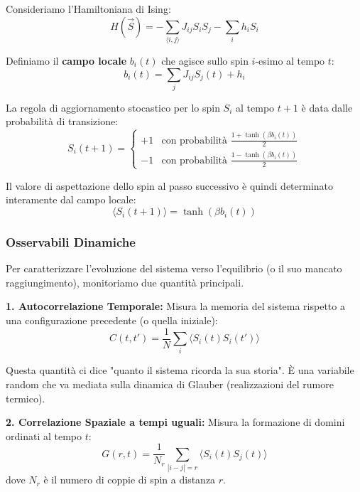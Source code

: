 \noindent Consideriamo l'Hamiltoniana di Ising:
\begin{equation}
H(\vec{S}) = - \sum_{\langle i,j \rangle} J_{ij} S_i S_j - \sum_i h_i S_i
\end{equation}

\noindent Definiamo il \textbf{campo locale} $b_i(t)$ che agisce sullo spin $i$-esimo al tempo $t$:
\begin{equation}
b_i(t) = \sum_{j} J_{ij} S_j(t) + h_i
\end{equation}

\noindent La regola di aggiornamento stocastico per lo spin $S_i$ al tempo $t+1$ è data dalle probabilità di transizione:
\begin{equation}
S_i(t+1) = \begin{cases} 
+1 & \text{con probabilità } \frac{1 + \tanh(\beta b_i(t))}{2} \\
-1 & \text{con probabilità } \frac{1 - \tanh(\beta b_i(t))}{2}
\end{cases}
\end{equation}

\noindent Il valore di aspettazione dello spin al passo successivo è quindi determinato interamente dal campo locale:
\begin{equation}
\langle S_i(t+1) \rangle = \tanh(\beta b_i(t))
\end{equation}

\subsubsection{Osservabili Dinamiche}

Per caratterizzare l'evoluzione del sistema verso l'equilibrio (o il suo mancato raggiungimento), monitoriamo due quantità principali.

\textbf{1. Autocorrelazione Temporale:}
Misura la memoria del sistema rispetto a una configurazione precedente (o quella iniziale):
\begin{equation}
C(t, t') = \frac{1}{N} \sum_i \langle S_i(t) S_i(t') \rangle
\end{equation}

\noindent Questa quantità ci dice "quanto il sistema ricorda la sua storia". È una variabile random che va mediata sulla dinamica di Glauber (realizzazioni del rumore termico).

\textbf{2. Correlazione Spaziale a tempi uguali:}
Misura la formazione di domini ordinati al tempo $t$:
\begin{equation}
G(r, t) = \frac{1}{N_r} \sum_{|i-j|=r} \langle S_i(t) S_j(t) \rangle
\end{equation}
dove $N_r$ è il numero di coppie di spin a distanza $r$.

